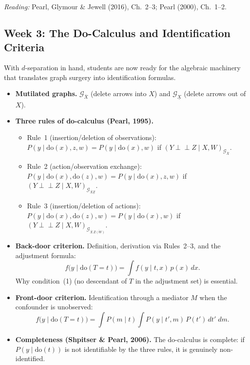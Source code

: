 \documentclass[12pt]{article}
\begin{document}
\noindent\textit{Reading:} Pearl, Glymour \& Jewell (2016), Ch.~2--3;
Pearl (2000), Ch.~1--2.

\subsection{Week 3: The Do-Calculus and Identification Criteria}

With $d$-separation in hand, students are now ready for the algebraic
machinery that translates graph surgery into identification formulas.

\begin{itemize}
  \item \textbf{Mutilated graphs.}
    $\mathcal{G}_{\overline{X}}$ (delete arrows into $X$) and
    $\mathcal{G}_{\underline{X}}$ (delete arrows out of $X$).

  \item \textbf{Three rules of do-calculus (Pearl, 1995).}
    \begin{itemize}
      \item Rule~1 (insertion/deletion of observations):
        $P(y \mid \mathrm{do}(x), z, w) = P(y \mid \mathrm{do}(x), w)$
        if $(Y \perp\!\!\!\perp Z \mid X,W)_{\mathcal{G}_{\overline{X}}}$.
      \item Rule~2 (action/observation exchange):
        $P(y \mid \mathrm{do}(x),\mathrm{do}(z),w)
         = P(y \mid \mathrm{do}(x),z,w)$
        if $(Y \perp\!\!\!\perp Z \mid X,W)_{\mathcal{G}_{\overline{X}\underline{Z}}}$.
      \item Rule~3 (insertion/deletion of actions):
        $P(y \mid \mathrm{do}(x),\mathrm{do}(z),w)
         = P(y \mid \mathrm{do}(x),w)$
        if $(Y \perp\!\!\!\perp Z \mid X,W)_{\mathcal{G}_{\overline{X}\,\overline{Z(W)}}}$.
    \end{itemize}

  \item \textbf{Back-door criterion.}
    Definition, derivation via Rules~2--3, and the adjustment formula:
    \[
      f\!\bigl(y \mid \mathrm{do}(T{=}t)\bigr)
      = \int f(y \mid t,x)\, p(x)\, dx.
    \]
    Why condition~(1) (no descendant of $T$ in the adjustment set) is
    essential.

  \item \textbf{Front-door criterion.}
    Identification through a mediator $M$ when the confounder is
    unobserved:
    \[
      f\!\bigl(y \mid \mathrm{do}(T{=}t)\bigr)
      = \int P(m \mid t) \int P(y \mid t', m)\, P(t')\, dt'\; dm.
    \]

  \item \textbf{Completeness (Shpitser \& Pearl, 2006).}
    The do-calculus is complete: if $P(y \mid \mathrm{do}(t))$ is not
    identifiable by the three rules, it is genuinely non-identified.
\end{itemize}
\end{document}
